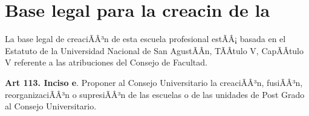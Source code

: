 \section{Base legal para la creaci n de la \SchoolFullName}

La base legal de creaciÃÂ³n de esta escuela profesional estÃÂ¡ basada en el Estatuto de la Universidad Nacional de San AgustÃÂ­n, TÃÂ­tulo V, CapÃÂ­tulo V referente a las atribuciones del Consejo de Facultad.

\textbf{Art 113. Inciso e}. Proponer al Consejo Universitario la creaciÃÂ³n, fusiÃÂ³n, reorganizaciÃÂ³n o supresiÃÂ³n de las escuelas o de las unidades de Post Grado al Consejo Universitario.
